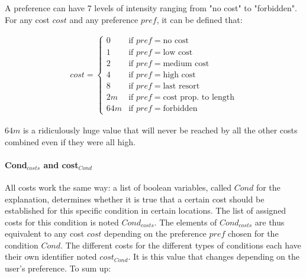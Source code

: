 A preference can have 7 levels of intensity ranging from "no cost" to "forbidden". For any cost $cost$ and any preference $pref$, it can be defined that:

\begin{equation}
    \begin{gathered}
        cost = \begin{cases}
            0 & \text{if } pref = \text{no cost}\\
            1 & \text{if } pref = \text{low cost}\\
            2 & \text{if } pref = \text{medium cost}\\
            4 & \text{if } pref = \text{high cost}\\
            8 & \text{if } pref = \text{last resort}\\
            2m & \text{if } pref = \text{cost prop. to length}\\
            64m & \text{if } pref = \text{forbidden}
        \end{cases}
    \end{gathered}
\end{equation}

$64m$ is a ridiculously huge value that will never be reached by all the other costs combined even if they were all high.

\paragraph{Cond$_{costs}$ and cost$_{Cond}$} All costs work the same way: a list of boolean variables, called $Cond$ for the explanation, determines whether it is true that a certain cost should be established for this specific condition in certain locations. The list of assigned costs for this condition is noted $Cond_{costs}$. The elements of $Cond_{costs}$ are thus equivalent to any cost $cost$ depending on the preference $pref$ chosen for the condition $Cond$. The different costs for the different types of conditions each have their own identifier noted $cost_{Cond}$. It is this value that changes depending on the user's preference. To sum up:


